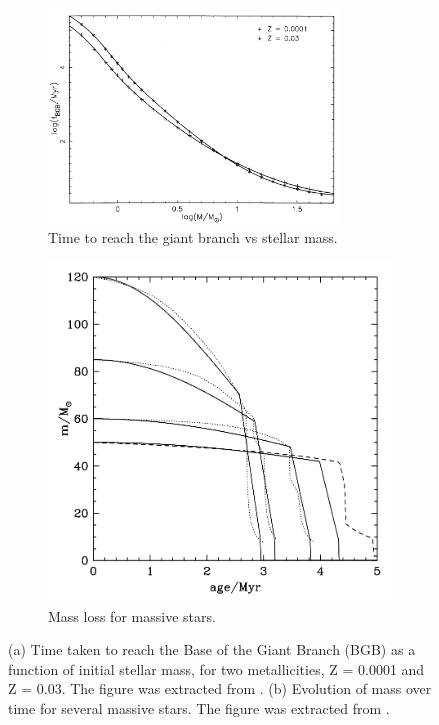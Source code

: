 \begin{figure}
    \centering
    \begin{subfigure}[b]{0.60\textwidth}
        \centering
        \includegraphics[width=0.85\textwidth]{Figures/7_stellarlifetime.png}
        \caption{Time to reach the giant branch vs stellar mass.}
        \label{Fig:7_stellarlifetime_hurley}
    \end{subfigure}
    \begin{subfigure}[b]{0.38\textwidth}
        \centering
        \includegraphics[width=\textwidth]{Figures/7_stellarlifetime_weidner.png}
        \caption{Mass loss for massive stars.}
        \label{Fig:7_stellarlifetime_weidner}
    \end{subfigure}
     \caption{(a) Time taken to reach the Base of the Giant Branch (BGB) as a function of initial stellar mass, for two metallicities, Z = 0.0001 and Z = 0.03. The figure was extracted from \cite{Hurley2000}. (b) Evolution of mass over time for several massive stars. The figure was extracted from \cite{Weidner2006}. }
     \label{Fig:7_stellarlifetime}
\end{figure}




